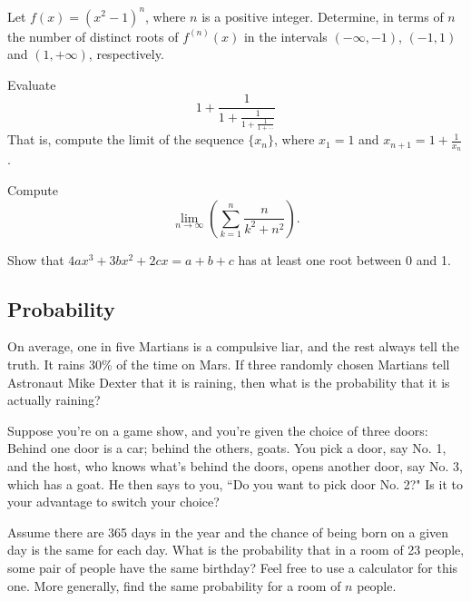 \documentclass[12pt]{article}
\begin{document}
        \begin{exercise}
            Let \(f(x)=(x^2-1)^n\), where \(n\) is a positive integer.
            Determine, in terms of \(n\) the number of distinct roots of \(f^{(n)}(x)\) in the intervals \((-\infty,-1)\), \((-1,1)\) and \((1,+\infty)\), respectively.
        \end{exercise}
            
        \begin{exercise}
            Evaluate
            \[1+\frac{1}{1+\frac{1}{1+\frac{1}{1+\cdots}}}\]
            That is, compute the limit of the sequence $\{x_n\}$, where $x_1 = 1$ and $x_{n+1}=1+\frac{1}{x_n}$.
        \end{exercise}
            
        \begin{exercise}
            Compute
            \[\lim_{n\to\infty}\left(\sum_{k=1}^n \frac{n}{k^2+n^2}\right).\]
        \end{exercise}

        \begin{exercise}
            Show that $4ax^3 + 3bx^2 + 2cx = a + b + c$ has at least one root between 0 and 1.
        \end{exercise}

    \subsection{Probability}

    \begin{exercise}
        On average, one in five Martians is a compulsive liar, and the rest always tell the truth.
        It rains \(30\%\) of the time on Mars.
        If three randomly chosen Martians tell Astronaut Mike Dexter that it is raining, then what is the probability that it is actually raining?
    \end{exercise}

    \begin{exercise}
        Suppose you're on a game show, and you're given the choice of three doors: Behind one door is a car; behind the others, goats. 
        You pick a door, say No. 1, and the host, who knows what's behind the doors, opens another door, say No. 3, which has a goat. 
        He then says to you, ``Do you want to pick door No. 2?" Is it to your advantage to switch your choice?
    \end{exercise}

    \begin{exercise}
        Assume there are 365 days in the year and the chance of being born on a given day is the same for each day.
        What is the probability that in a room of 23 people, some pair of people have the same birthday?
        Feel free to use a calculator for this one.
        More generally, find the same probability for a room of \(n\) people.
    \end{exercise}
\end{document}
